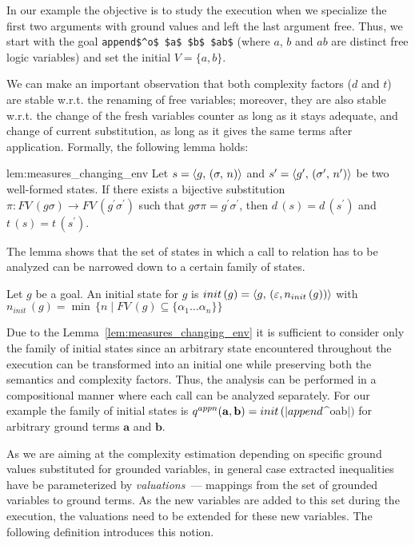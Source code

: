 In our example the objective is to study the execution when we specialize the first two arguments with
ground values and left the last argument free. Thus, we start with the goal \lstinline|append$^o$ $a$ $b$ $ab$|
(where $a$, $b$ and $ab$ are distinct free logic variables) and set the initial $V = \{ a, b \}$.

We can make an important observation that both complexity factors ($d$ and $t$) are stable w.r.t. the renaming of
free variables; moreover, they are also stable w.r.t. the change of the fresh variables counter as long as it stays
adequate, and change of current substitution, as long as it gives the same terms after application.
Formally, the following lemma holds:

\begin{replemma}{lem:measures_changing_env}
Let $s = \langle g ,\, (\sigma ,\, n) \rangle$ and $s' = \langle g^\prime ,\, (\sigma^\prime ,\, n^\prime) \rangle$ be two well-formed states.
If  there exists a bijective substitution $\pi \colon FV\,(g \sigma) \to FV\,(g^\prime \sigma^\prime)$ such that
$g \sigma \pi = g^\prime \sigma^\prime $, then $d\,(s) = d\,(s^\prime)$ and $t\,(s) = t\,(s^\prime)$.
\end{replemma}

The lemma shows that the set of states in which a call to relation has to be analyzed can
be narrowed down to a certain family of states. 

\begin{definition} Let $g$ be a goal. An initial state for $g$ is $init\,(g)=\langle g ,\, (\varepsilon, n_{init}\,(g)) \rangle $
with $ n_{init}\,(g) = \min\, \{ n \mid FV\,(g) \subseteq \{ \alpha_1\dots\alpha_n \} \} $
\end{definition}

Due to the Lemma~\ref{lem:measures_changing_env} it is sufficient to consider only the family of initial states since an arbitrary state
encountered throughout the execution can be transformed into an initial one while preserving both the semantics and
complexity factors. Thus, the analysis can be performed in a compositional manner where each call can be analyzed separately.
For our example the family of initial states is $q^{appn}(\mathbf{a}, \mathbf{b}) = init\,(\lstinline|append$^o$ $$ $$ $ab$|)$ for arbitrary ground
terms $\mathbf{a}$ and $\mathbf{b}$.

As we are aiming at the complexity estimation depending on specific ground values substituted for grounded variables, in general case extracted
inequalities have be parameterized by \emph{valuations}~--- mappings from the set of grounded variables to ground terms. As the new variables
are added to this set during the execution, the valuations need to be extended for these new variables. The following definition introduces this notion.

